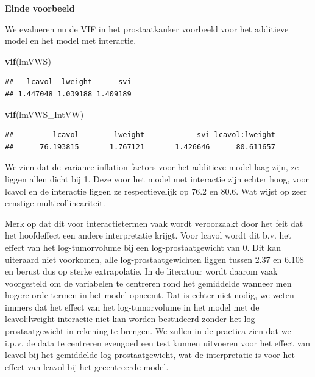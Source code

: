 \documentclass[
  12pt,dutch]{book}
\newenvironment{Shaded}{\begin{snugshade}}{\end{snugshade}}
\newcommand{\FunctionTok}[1]{\textcolor[rgb]{0.13,0.29,0.53}{\textbf{#1}}}
\newcommand{\NormalTok}[1]{#1}
\theoremstyle{definition}
\theoremstyle{definition}
\theoremstyle{definition}
\theoremstyle{definition}
\theoremstyle{remark}
\begin{document}
\textbf{Einde voorbeeld}

We evalueren nu de VIF in het prostaatkanker voorbeeld voor het additieve model en het model met interactie.

\begin{Shaded}
\begin{Highlighting}[]
\FunctionTok{vif}\NormalTok{(lmVWS)}
\end{Highlighting}
\end{Shaded}

\begin{verbatim}
##   lcavol  lweight      svi 
## 1.447048 1.039188 1.409189
\end{verbatim}

\begin{Shaded}
\begin{Highlighting}[]
\FunctionTok{vif}\NormalTok{(lmVWS\_IntVW)}
\end{Highlighting}
\end{Shaded}

\begin{verbatim}
##         lcavol        lweight            svi lcavol:lweight 
##      76.193815       1.767121       1.426646      80.611657
\end{verbatim}

We zien dat de variance inflation factors voor het additieve model laag zijn, ze liggen allen dicht bij 1.
Deze voor het model met interactie zijn echter hoog, voor lcavol en de interactie liggen ze respectievelijk op 76.2 en 80.6.
Wat wijst op zeer ernstige multicollineariteit.

Merk op dat dit voor interactietermen vaak wordt veroorzaakt door het feit dat het hoofdeffect een andere interpretatie krijgt. Voor lcavol wordt dit b.v. het effect van het log-tumorvolume bij een log-prostaatgewicht van 0. Dit kan uiteraard niet voorkomen, alle log-prostaatgewichten liggen tussen 2.37 en 6.108 en berust dus op sterke extrapolatie. In de literatuur wordt daarom vaak voorgesteld om de variabelen te centreren rond het gemiddelde wanneer men hogere orde termen in het model opneemt. Dat is echter niet nodig, we weten immers dat het effect van het log-tumorvolume in het model met de lcavol:lweight interactie niet kan worden bestudeerd zonder het log-prostaatgewicht in rekening te brengen.
We zullen in de practica zien dat we i.p.v. de data te centreren evengoed een test kunnen uitvoeren voor het effect van lcavol bij het gemiddelde log-prostaatgewicht, wat de interpretatie is voor het effect van lcavol bij het gecentreerde model.
\end{document}
